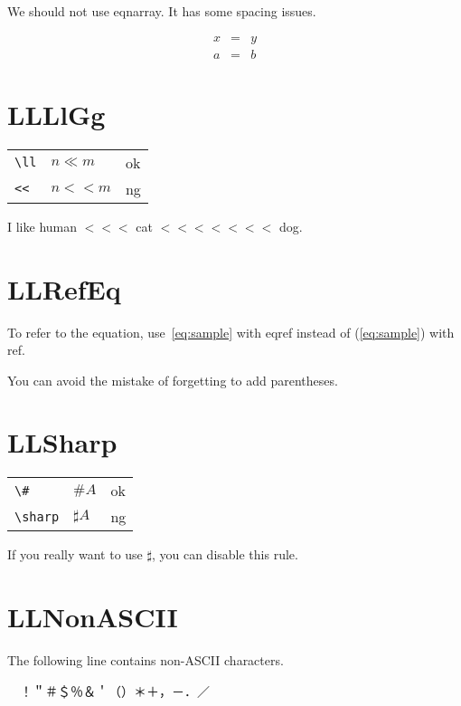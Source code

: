 \documentclass[a4paper]{article}
\newcommand{\tA}[1]{\textcolor{cA}{#1}}
\newcommand{\tD}[1]{\textcolor{cD}{#1}}
\begin{document}
We should not use eqnarray. It has some spacing issues.

\begin{eqnarray*}
	x & = & y \\
	a & = & b
\end{eqnarray*}

\section{LLLlGg}

\begin{table}[H]
	\centering
	\begin{tabular}{lll}
		\verb|\ll| & $n\ll m$ & \tA{ok} \\
		\verb|<<|  & $n << m$ & \tD{ng} \\
	\end{tabular}
\end{table}

I like human $<<<$ cat $<<<<<<<$ dog.

\section{LLRefEq}

To refer to the equation, use~\eqref{eq:sample} with eqref instead of (\ref{eq:sample}) with ref.

You can avoid the mistake of forgetting to add parentheses.

\section{LLSharp}

\begin{table}[H]
	\centering
	\begin{tabular}{lll}
		\verb|\#|     & $\#A$      & \tA{ok} \\
		\verb|\sharp| & $\sharp A$ & \tD{ng}
	\end{tabular}
\end{table}

If you really want to use $\sharp$, you can disable this rule.

\section{LLNonASCII}

The following line contains non-ASCII characters.

\begin{CJK}{UTF8}{ipxm}{　}！＂＃＄％＆＇（）＊＋，－．／\end{CJK}
\end{document}
